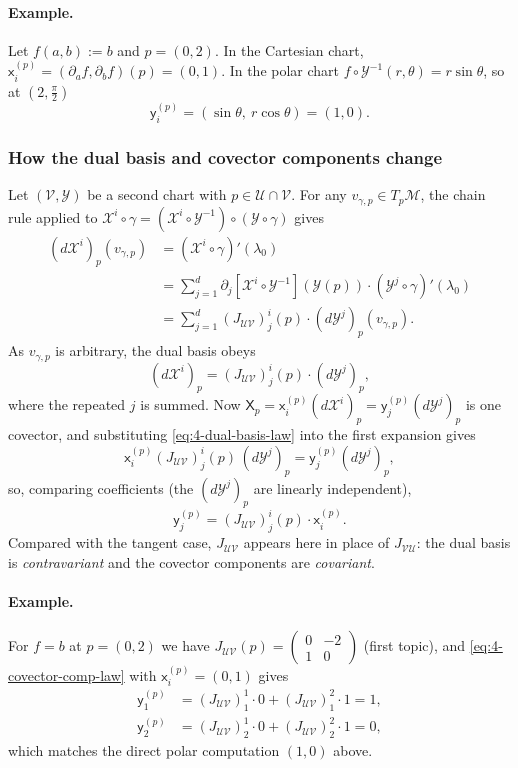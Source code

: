 \documentclass[11pt]{article}
\newcommand{\TpM}{T_p\mathcal M}
\begin{document}
\paragraph{Example.} Let $f(a,b):=b$ and $p=(0,2)$. In the Cartesian chart, $\mathsf x^{(p)}_i=(\partial_af,\partial_bf)(p)=(0,1)$. In the polar chart $f\circ\mathcal Y^{-1}(r,\theta)=r\sin\theta$, so at $(2,\tfrac\pi2)$
\[
\mathsf y^{(p)}_i=(\sin\theta,\ r\cos\theta)=(1,0).
\]

\subsubsection*{How the dual basis and covector components change}
Let $(\mathcal V,\mathcal Y)$ be a second chart with $p\in\mathcal U\cap\mathcal V$. For any $v_{\gamma,p}\in\TpM$, the chain rule applied to $\mathcal X^i\circ\gamma=(\mathcal X^i\circ\mathcal Y^{-1})\circ(\mathcal Y\circ\gamma)$ gives
\begin{align*}
(d\mathcal X^i)_p(v_{\gamma,p})&=(\mathcal X^i\circ\gamma)'(\lambda_0)\\
&=\sum_{j=1}^d\partial_j[\mathcal X^i\circ\mathcal Y^{-1}](\mathcal Y(p))\cdot(\mathcal Y^j\circ\gamma)'(\lambda_0)\\
&=\sum_{j=1}^d(J_{\mathcal{UV}})^i_j(p)\cdot(d\mathcal Y^j)_p(v_{\gamma,p}).
\end{align*}
As $v_{\gamma,p}$ is arbitrary, the dual basis obeys
\begin{equation}
(d\mathcal X^i)_p=(J_{\mathcal{UV}})^i_j(p)\cdot(d\mathcal Y^j)_p,
\tag{4.4}\label{eq:4-dual-basis-law}
\end{equation}
where the repeated $j$ is summed. Now $\mathsf X_p=\mathsf x^{(p)}_i(d\mathcal X^i)_p=\mathsf y^{(p)}_j(d\mathcal Y^j)_p$ is one covector, and substituting \eqref{eq:4-dual-basis-law} into the first expansion gives
\[
\mathsf x^{(p)}_i(J_{\mathcal{UV}})^i_j(p)\,(d\mathcal Y^j)_p=\mathsf y^{(p)}_j(d\mathcal Y^j)_p,
\]
so, comparing coefficients (the $(d\mathcal Y^j)_p$ are linearly independent),
\begin{equation}
\mathsf y^{(p)}_j=(J_{\mathcal{UV}})^i_j(p)\cdot\mathsf x^{(p)}_i.
\tag{4.5}\label{eq:4-covector-comp-law}
\end{equation}
Compared with the tangent case, $J_{\mathcal{UV}}$ appears here in place of $J_{\mathcal{VU}}$: the dual basis is \emph{contravariant} and the covector components are \emph{covariant}.

\paragraph{Example.} For $f=b$ at $p=(0,2)$ we have $J_{\mathcal{UV}}(p)=\begin{pmatrix}0&-2\\1&0\end{pmatrix}$ (first topic), and \eqref{eq:4-covector-comp-law} with $\mathsf x^{(p)}_i=(0,1)$ gives
\begin{align*}
\mathsf y^{(p)}_1&=(J_{\mathcal{UV}})^1_1\cdot0+(J_{\mathcal{UV}})^2_1\cdot1=1,\\
\mathsf y^{(p)}_2&=(J_{\mathcal{UV}})^1_2\cdot0+(J_{\mathcal{UV}})^2_2\cdot1=0,
\end{align*}
which matches the direct polar computation $(1,0)$ above.
\end{document}
